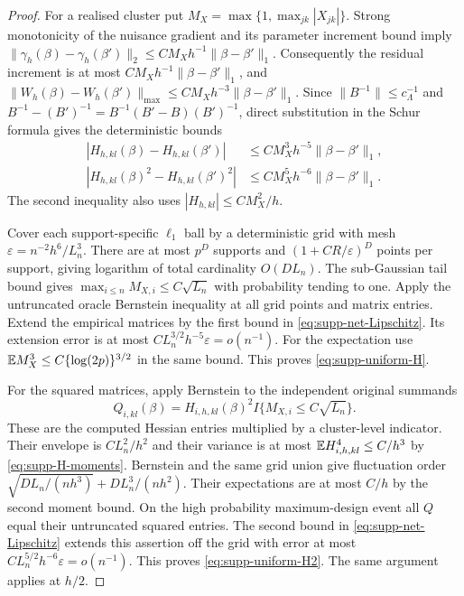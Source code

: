 \begin{proof}
For a realised cluster put $M_X=\max\{1,\max_{jk}|X_{jk}|\}$.
Strong monotonicity of the nuisance gradient and its parameter
increment bound imply
$\|\gamma_h(\beta)-\gamma_h(\beta')\|_2
\leq CM_Xh^{-1}\|\beta-\beta'\|_1$.
Consequently the residual increment is at most
$CM_Xh^{-1}\|\beta-\beta'\|_1$, and
$\|W_h(\beta)-W_h(\beta')\|_{\max}
\leq CM_Xh^{-3}\|\beta-\beta'\|_1$.
Since $\|B^{-1}\|\leq c_\Lambda^{-1}$ and
$B^{-1}-(B')^{-1}=B^{-1}(B'-B)(B')^{-1}$, direct substitution
in the Schur formula gives the deterministic bounds
\begin{align}
 |H_{h,kl}(\beta)-H_{h,kl}(\beta')|
   &\leq CM_X^3h^{-5}\|\beta-\beta'\|_1,\nonumber\\
 |H_{h,kl}(\beta)^2-H_{h,kl}(\beta')^2|
   &\leq CM_X^5h^{-6}\|\beta-\beta'\|_1.
 \label{eq:supp-net-Lipschitz}
\end{align}
The second inequality also uses $|H_{h,kl}|\leq CM_X^2/h$.

Cover each support-specific $\ell_1$ ball by a deterministic grid
with mesh $\varepsilon=n^{-2}h^6/L_n^3$. There are at most $p^D$
supports and $(1+CR/\varepsilon)^D$ points per support, giving
logarithm of total cardinality $O(D L_n)$.
The sub-Gaussian tail bound gives
$\max_{i\leq n}M_{X,i}\leq C\sqrt{L_n}$ with probability tending
to one. Apply the untruncated oracle Bernstein inequality at all grid
points and matrix entries. Extend the empirical matrices by the first
bound in \eqref{eq:supp-net-Lipschitz}. Its extension error is at most
$CL_n^{3/2}h^{-5}\varepsilon=o(n^{-1})$.
For the expectation use
$\mathbb{E} M_X^3\leq C\{\log(2p)\}^{3/2}$ in the same bound.
This proves \eqref{eq:supp-uniform-H}.

For the squared matrices, apply Bernstein to the independent original
summands
\[
 Q_{i,kl}(\beta)=H_{i,h,kl}(\beta)^2
                    I\{M_{X,i}\leq C\sqrt{L_n}\}.
\]
These are the computed Hessian entries multiplied by a cluster-level
indicator. Their envelope is $CL_n^2/h^2$ and their variance is at
most $\mathbb{E} H_{i,h,kl}^4\leq C/h^3$ by
\eqref{eq:supp-H-moments}. Bernstein and the same grid union give
fluctuation order
$\sqrt{D L_n/(nh^3)}+D L_n^3/(nh^2)$.
Their expectations are at most $C/h$ by the second moment bound.
On the high probability maximum-design event all $Q$ equal their
untruncated squared entries. The second bound in
\eqref{eq:supp-net-Lipschitz} extends this assertion off the grid
with error at most $CL_n^{5/2}h^{-6}\varepsilon=o(n^{-1})$.
This proves \eqref{eq:supp-uniform-H2}. The same argument applies at
$h/2$.
\end{proof}

